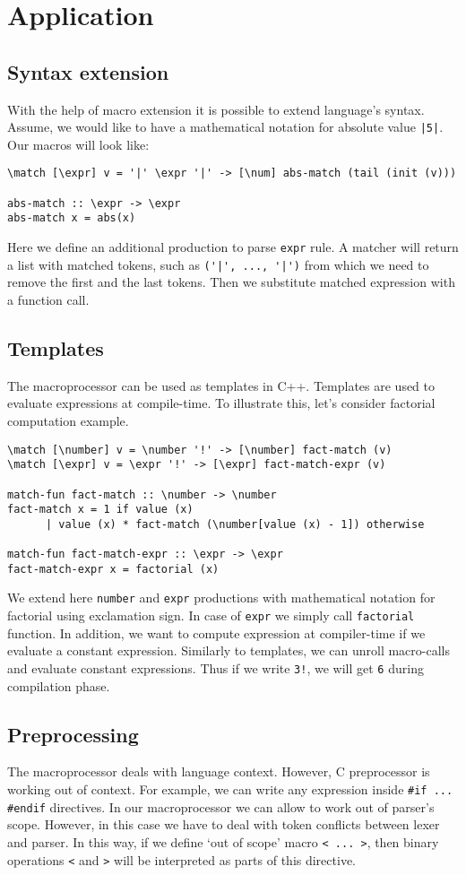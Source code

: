 \section{Application}
\subsection{Syntax extension}
With the help of macro extension it is possible to extend language's syntax.
Assume, we would like to have a mathematical notation for absolute value
\verb/|5|/. Our macros will look like:
\begin{verbatim}
\match [\expr] v = '|' \expr '|' -> [\num] abs-match (tail (init (v)))

abs-match :: \expr -> \expr
abs-match x = abs(x)
\end{verbatim}
Here we define an additional production to parse \verb|expr| rule. A matcher
will return a list with matched tokens, such as 
\verb/('|', ..., '|')/ from which we need to remove the
first and the last tokens. Then we substitute matched expression with a
function call.
\subsection{Templates}
The macroprocessor can be used as templates in C++. Templates are used to
evaluate expressions at compile-time. To illustrate this, let's consider
factorial computation example.
\begin{verbatim}
\match [\number] v = \number '!' -> [\number] fact-match (v)
\match [\expr] v = \expr '!' -> [\expr] fact-match-expr (v)

match-fun fact-match :: \number -> \number
fact-match x = 1 if value (x)
      | value (x) * fact-match (\number[value (x) - 1]) otherwise

match-fun fact-match-expr :: \expr -> \expr
fact-match-expr x = factorial (x)
\end{verbatim}
We extend here \verb|number| and \verb|expr| productions with mathematical
notation for factorial using exclamation sign. In case of \verb|expr| we simply
call \verb|factorial| function. In addition, we want to compute expression at
compiler-time if we evaluate a constant expression. Similarly to templates, we
can unroll macro-calls and evaluate constant expressions. Thus if we write
\verb|3!|, we will get \verb|6| during compilation phase.
\subsection{Preprocessing}
The macroprocessor deals with language context. However, C preprocessor is
working out of context. For example, we can write any expression inside
\verb|#if ... #endif| directives. In our macroprocessor we can allow to work
out of parser's scope. However, in this case we have to deal with token
conflicts between lexer and parser. In this way, if we define `out of scope'
macro \verb|< ... >|, then binary operations \verb|<| and \verb|>| will be
interpreted as parts of this directive.  
